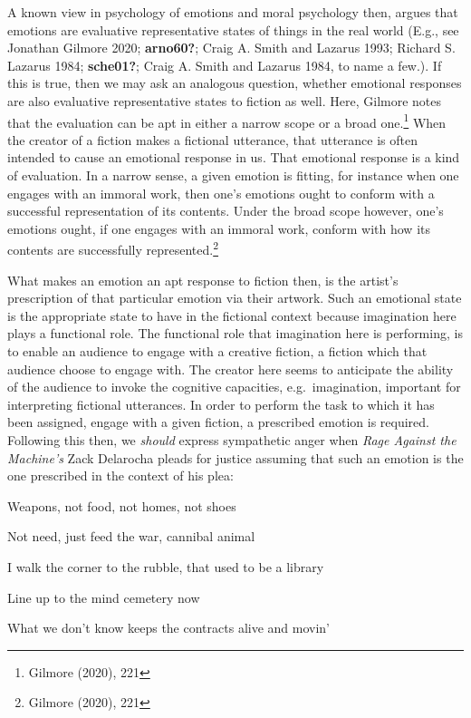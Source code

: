 \documentclass[12pt]{book}
\theoremstyle{definition}
\theoremstyle{remark}
\begin{document}
A known view in psychology of emotions and moral psychology then, argues that emotions are evaluative representative states of things in the real world (E.g., see Jonathan Gilmore 2020; \textbf{arno60?}; Craig A. Smith and Lazarus 1993; Richard S. Lazarus 1984; \textbf{sche01?}; Craig A. Smith and Lazarus 1984, to name a few.). If this is true, then we may ask an analogous question, whether emotional responses are also evaluative representative states to fiction as well. Here, Gilmore notes that the evaluation can be apt in either a narrow scope or a broad one.\footnote{Gilmore (2020), 221} When the creator of a fiction makes a fictional utterance, that utterance is often intended to cause an emotional response in us. That emotional response is a kind of evaluation. In a narrow sense, a given emotion is fitting, for instance when one engages with an immoral work, then one's emotions ought to conform with a successful representation of its contents. Under the broad scope however, one's emotions ought, if one engages with an immoral work, conform with how its contents are successfully represented.\footnote{Gilmore (2020), 221}

What makes an emotion an apt response to fiction then, is the artist's prescription of that particular emotion via their artwork. Such an emotional state is the appropriate state to have in the fictional context because imagination here plays a functional role. The functional role that imagination here is performing, is to enable an audience to engage with a creative fiction, a fiction which that audience choose to engage with. The creator here seems to anticipate the ability of the audience to invoke the cognitive capacities, e.g.~imagination, important for interpreting fictional utterances. In order to perform the task to which it has been assigned, engage with a given fiction, a prescribed emotion is required. Following this then, we \emph{should} express sympathetic anger when \emph{Rage Against the Machine's} Zack Delarocha pleads for justice assuming that such an emotion is the one prescribed in the context of his plea:

Weapons, not food, not homes, not shoes

Not need, just feed the war, cannibal animal

I walk the corner to the rubble, that used to be a library

Line up to the mind cemetery now

What we don't know keeps the contracts alive and movin'
\end{document}
